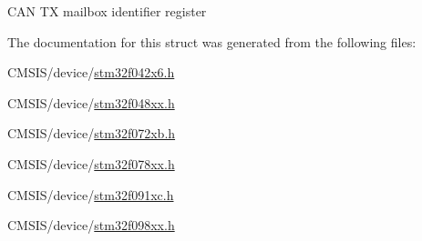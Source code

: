 C\+AN TX mailbox identifier register 

The documentation for this struct was generated from the following files\+:\begin{DoxyCompactItemize}
\item 
C\+M\+S\+I\+S/device/\hyperlink{stm32f042x6_8h}{stm32f042x6.\+h}\item 
C\+M\+S\+I\+S/device/\hyperlink{stm32f048xx_8h}{stm32f048xx.\+h}\item 
C\+M\+S\+I\+S/device/\hyperlink{stm32f072xb_8h}{stm32f072xb.\+h}\item 
C\+M\+S\+I\+S/device/\hyperlink{stm32f078xx_8h}{stm32f078xx.\+h}\item 
C\+M\+S\+I\+S/device/\hyperlink{stm32f091xc_8h}{stm32f091xc.\+h}\item 
C\+M\+S\+I\+S/device/\hyperlink{stm32f098xx_8h}{stm32f098xx.\+h}\end{DoxyCompactItemize}
